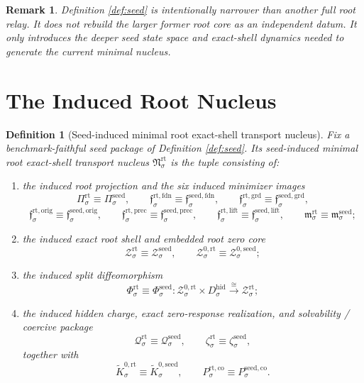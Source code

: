 \documentclass[11pt]{article}
\newcommand{\HiddenBody}[1]{D_{#1}^{\mathrm{hid}}}
\newcommand{\SeedProj}[1]{\Pi_{#1}^{\mathrm{seed}}}
\newcommand{\SeedFoundMin}[1]{\mathfrak f_{#1}^{\mathrm{seed,fdn}}}
\newcommand{\SeedGroundMin}[1]{\mathfrak f_{#1}^{\mathrm{seed,grd}}}
\newcommand{\SeedOrigMin}[1]{\mathfrak f_{#1}^{\mathrm{seed,orig}}}
\newcommand{\SeedPrecMin}[1]{\mathfrak f_{#1}^{\mathrm{seed,prec}}}
\newcommand{\SeedLiftMin}[1]{\mathfrak f_{#1}^{\mathrm{seed,lift}}}
\newcommand{\SeedSubMin}[1]{\mathfrak m_{#1}^{\mathrm{seed}}}
\newcommand{\SeedShellSet}[1]{\mathcal Z_{#1}^{\mathrm{seed}}}
\newcommand{\SeedZeroCore}[1]{\mathcal Z_{#1}^{0,\mathrm{seed}}}
\newcommand{\SeedSplit}[1]{\Phi_{#1}^{\mathrm{seed}}}
\newcommand{\SeedCharge}[1]{\mathcal Q_{#1}^{\mathrm{seed}}}
\newcommand{\SeedEmbed}[1]{\zeta_{#1}^{\mathrm{seed}}}
\newcommand{\SeedKernelCh}[1]{\widetilde K_{#1}^{0,\mathrm{seed}}}
\newcommand{\SeedStateComp}[1]{P_{#1}^{\mathrm{seed,co}}}
\newcommand{\RootNucleus}[1]{\mathfrak N_{#1}^{\mathrm{rt}}}
\newcommand{\RootProj}[1]{\Pi_{#1}^{\mathrm{rt}}}
\newcommand{\RootFoundMin}[1]{\mathfrak f_{#1}^{\mathrm{rt,fdn}}}
\newcommand{\RootGroundMin}[1]{\mathfrak f_{#1}^{\mathrm{rt,grd}}}
\newcommand{\RootOrigMin}[1]{\mathfrak f_{#1}^{\mathrm{rt,orig}}}
\newcommand{\RootPrecMin}[1]{\mathfrak f_{#1}^{\mathrm{rt,prec}}}
\newcommand{\RootLiftMin}[1]{\mathfrak f_{#1}^{\mathrm{rt,lift}}}
\newcommand{\RootSubMin}[1]{\mathfrak m_{#1}^{\mathrm{rt}}}
\newcommand{\RootShellSet}[1]{\mathcal Z_{#1}^{\mathrm{rt}}}
\newcommand{\RootZeroCore}[1]{\mathcal Z_{#1}^{0,\mathrm{rt}}}
\newcommand{\RootSplit}[1]{\Phi_{#1}^{\mathrm{rt}}}
\newcommand{\RootCharge}[1]{\mathcal Q_{#1}^{\mathrm{rt}}}
\newcommand{\RootEmbed}[1]{\zeta_{#1}^{\mathrm{rt}}}
\newcommand{\RootKernelCh}[1]{\widetilde K_{#1}^{0,\mathrm{rt}}}
\newcommand{\RootStateComp}[1]{P_{#1}^{\mathrm{rt,co}}}
\newtheorem{definition}{Definition}
\newtheorem{remark}{Remark}
\begin{document}
\begin{remark}
Definition \ref{def:seed} is intentionally narrower than another full root relay. It does not rebuild the larger former root core as an independent datum. It only introduces the deeper seed state space and exact-shell dynamics needed to generate the current minimal nucleus.
\end{remark}

\section{The Induced Root Nucleus}

\begin{definition}[Seed-induced minimal root exact-shell transport nucleus]
\label{def:induced}
Fix a benchmark-faithful seed package of Definition \ref{def:seed}. Its \emph{seed-induced minimal root exact-shell transport nucleus} \(\RootNucleus{\sigma}\) is the tuple consisting of:
\begin{enumerate}
    \item the induced root projection and the six induced minimizer images
    \[
    \RootProj{\sigma}\equiv\SeedProj{\sigma},
    \qquad
    \RootFoundMin{\sigma}\equiv\SeedFoundMin{\sigma},
    \qquad
    \RootGroundMin{\sigma}\equiv\SeedGroundMin{\sigma},
    \]
    \[
    \RootOrigMin{\sigma}\equiv\SeedOrigMin{\sigma},
    \qquad
    \RootPrecMin{\sigma}\equiv\SeedPrecMin{\sigma},
    \qquad
    \RootLiftMin{\sigma}\equiv\SeedLiftMin{\sigma},
    \qquad
    \RootSubMin{\sigma}\equiv\SeedSubMin{\sigma};
    \]
    \item the induced exact root shell and embedded root zero core
    \[
    \RootShellSet{\sigma}\equiv\SeedShellSet{\sigma},
    \qquad
    \RootZeroCore{\sigma}\equiv\SeedZeroCore{\sigma};
    \]
    \item the induced split diffeomorphism
    \[
    \RootSplit{\sigma}\equiv\SeedSplit{\sigma}:
    \RootZeroCore{\sigma}\times\HiddenBody{\sigma}
    \xrightarrow{\cong}
    \RootShellSet{\sigma};
    \]
    \item the induced hidden charge, exact zero-response realization, and solvability / coercive package
    \[
    \RootCharge{\sigma}\equiv\SeedCharge{\sigma},
    \qquad
    \RootEmbed{\sigma}\equiv\SeedEmbed{\sigma},
    \]
    together with
    \[
    \RootKernelCh{\sigma}\equiv\SeedKernelCh{\sigma},
    \qquad
    \RootStateComp{\sigma}\equiv\SeedStateComp{\sigma}.
    \]
\end{enumerate}
\end{definition}
\end{document}

